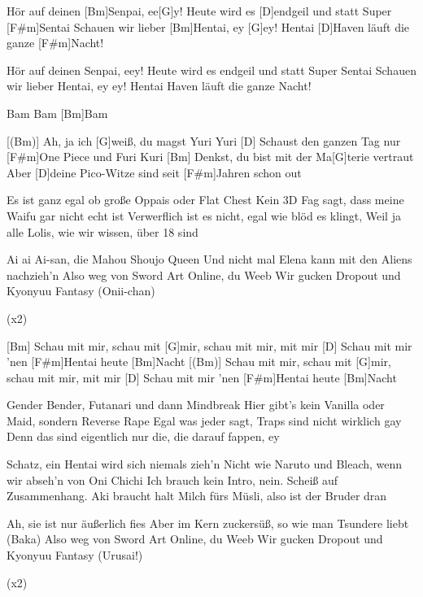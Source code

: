 

\begin{guitar}
	Hör auf deinen [Bm]Senpai, ee[G]y!
	Heute wird es [D]endgeil und statt Super [F#m]Sentai
	Schauen wir lieber [Bm]Hentai, ey [G]ey!
	Hentai [D]Haven läuft die ganze [F#m]Nacht!
	
	Hör auf deinen Senpai, eey!
	Heute wird es endgeil und statt Super Sentai
	Schauen wir lieber Hentai, ey ey!
	Hentai Haven läuft die ganze Nacht!
	
	Bam Bam [Bm]Bam
	
	[(Bm)] Ah, ja ich [G]weiß, du magst Yuri Yuri
	[D] Schaust den ganzen Tag nur [F#m]One Piece und Furi Kuri
	[Bm] Denkst, du bist mit der Ma[G]terie vertraut
	Aber [D]deine Pico-Witze sind seit [F#m]Jahren schon out
	
	Es ist ganz egal ob große Oppais oder Flat Chest
	Kein 3D Fag sagt, dass meine Waifu gar nicht echt ist
	Verwerflich ist es nicht, egal wie blöd es klingt,
	Weil ja alle Lolis, wie wir wissen, über 18 sind
	
	Ai ai Ai-san, die Mahou Shoujo Queen
	Und nicht mal Elena kann mit den Aliens nachzieh'n
	Also weg von Sword Art Online, du Weeb
	Wir gucken Dropout und Kyonyuu Fantasy (Onii-chan)
	
	  (x2)
	
	[Bm] Schau mit mir, schau mit [G]mir, schau mit mir, mit mir
	[D] Schau mit mir 'nen [F#m]Hentai heute [Bm]Nacht
	[(Bm)] Schau mit mir, schau mit [G]mir, schau mit mir, mit mir
	[D] Schau mit mir 'nen [F#m]Hentai heute [Bm]Nacht
	
	Gender Bender, Futanari und dann Mindbreak
	Hier gibt's kein Vanilla oder Maid, sondern Reverse Rape
	Egal was jeder sagt, Traps sind nicht wirklich gay
	Denn das sind eigentlich nur die, die darauf fappen, ey
	
	Schatz, ein Hentai wird sich niemals zieh'n
	Nicht wie Naruto und Bleach, wenn wir abseh'n von Oni Chichi
	Ich brauch kein Intro, nein. Scheiß auf Zusammenhang.
	Aki braucht halt Milch fürs Müsli, also ist der Bruder dran
	
	Ah, sie ist nur äußerlich fies
	Aber im Kern zuckersüß, so wie man Tsundere liebt (Baka)
	Also weg von Sword Art Online, du Weeb
	Wir gucken Dropout und Kyonyuu Fantasy (Urusai!)
	
	  (x2)
	
	
\end{guitar}
